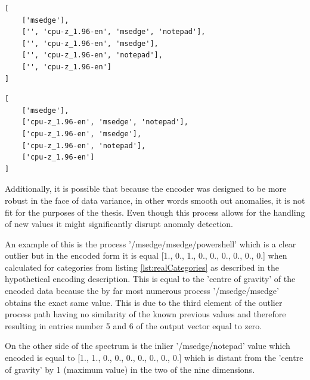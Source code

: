 \documentclass[a4paper,twoside,12pt]{book}
\begin{document}
\begin{lstlisting}[label={lst:categories},caption={Categories calculated from real split path data.}]
[
	['msedge'],
	['', 'cpu-z_1.96-en', 'msedge', 'notepad'],
 	['', 'cpu-z_1.96-en', 'msedge'],
	['', 'cpu-z_1.96-en', 'notepad'],
 	['', 'cpu-z_1.96-en']
]
\end{lstlisting}


\begin{lstlisting}[label={lst:realCategories},caption={Practical categories resulting from encoder mishandling empty strings.}]
[
	['msedge'],
	['cpu-z_1.96-en', 'msedge', 'notepad'],
	['cpu-z_1.96-en', 'msedge'],
	['cpu-z_1.96-en', 'notepad'],
	['cpu-z_1.96-en']
]
\end{lstlisting}

Additionally, it is possible that because the encoder was designed to be more robust in the face of
data variance, in other words smooth out anomalies, it is not fit for the purposes of the thesis. 
Even though this process allows for the handling of new values it might significantly disrupt anomaly detection.

An example of this is the process '/msedge/msedge/powershell' which is a clear outlier
but in the encoded form it is equal [1., 0., 1., 0., 0., 0., 0., 0., 0.] when calculated for 
categories from listing \ref{lst:realCategories} as described in the hypothetical encoding description.
This is equal to the 'centre of gravity' of the encoded data because the by far most numerous process
'/msedge/msedge' obtains the exact same value. This is due to the third element of the outlier process  
path having no similarity of the known previous values and therefore resulting in entries number 5 and 6
of the output vector equal to zero.

On the other side of the spectrum is the inlier '/msedge/notepad' value which encoded is equal to
[1., 1., 0., 0., 0., 0., 0., 0., 0.] which is distant from the 'centre of gravity' by 1 (maximum 
value) in the two of the nine dimensions. 
\end{document}
